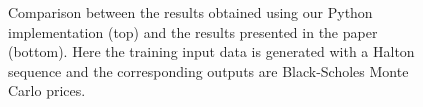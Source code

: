 \documentclass[a4paper,12pt]{article}
\begin{document}
\begin{figure} [H]
     \begin{subfigure}[c]{0.49\textwidth}
         \centering
     \end{subfigure}
     \hfill
     \begin{subfigure}[c]{0.49\textwidth}
         \centering
     \end{subfigure}
    \caption{Comparison between the results obtained using our Python implementation (top) and the results presented in the paper \cite{Ludkovski2020} (bottom). Here the training input data is generated with a Halton sequence and the corresponding outputs are Black-Scholes Monte Carlo prices.}
    \label{fig:comparing_to_paper}
\end{figure}
\end{document}
